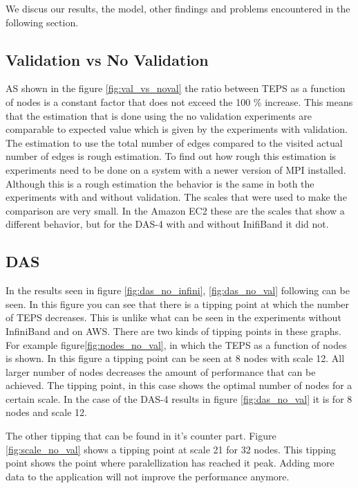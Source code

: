 We discus our results, the model, other findings and problems encountered in the following section.

\subsection{Validation vs No Validation}
\label{dis:val}
AS shown in the figure \ref{fig:val_vs_noval} the ratio between TEPS as a function of nodes is a constant factor that does not exceed the 100 \% increase. This means that the estimation that is done using the no validation experiments are comparable to expected value which is given by the experiments with validation. The estimation to use the total number of edges compared to the visited actual number of edges is rough estimation. To find out how rough this estimation is experiments need to be done on a system with a newer version of MPI installed. Although this is a rough estimation the behavior is the same in both the experiments with and without validation.
The scales that were used to make the comparison are very small. In the Amazon EC2 these are the scales that show a different behavior, but for the DAS-4 with and without InifiBand it did not. 

\subsection{DAS}
In the results seen in figure \ref{fig:das_no_infini}, \ref{fig:das_no_val} following can be seen. In this figure you can see that there is a tipping point at which the number of TEPS decreases. This is unlike what can be seen in the experiments without InfiniBand and on AWS. There are two kinds of tipping points in these graphs. For example figure\ref{fig:nodes_no_val}, in which the TEPS as a function of nodes is shown. In this figure a tipping point can be seen at 8 nodes with scale 12. All larger number of nodes decreases the amount of performance that can be achieved. The tipping point, in this case shows the optimal number of nodes for a certain scale. In the case of the DAS-4 results in figure \ref{fig:das_no_val} it is for 8 nodes and scale 12.

The other tipping that can be found in it's counter part. Figure \ref{fig:scale_no_val} shows a tipping point at scale 21 for 32 nodes. This tipping point shows the point where paralellization has reached it peak. Adding more data to the application will not improve the performance anymore. 

